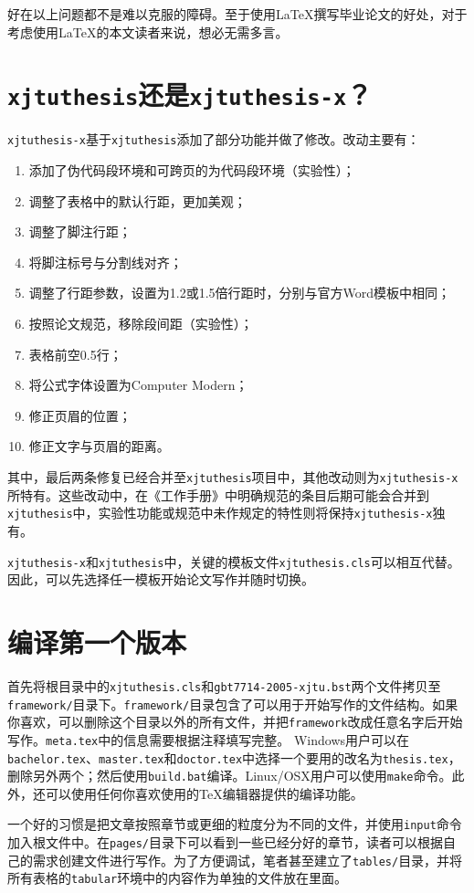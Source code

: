 好在以上问题都不是难以克服的障碍。至于使用\LaTeX 撰写毕业论文的好处，对于考虑使用\LaTeX 的本文读者来说，想必无需多言。

\section{\texttt{xjtuthesis}还是\texttt{xjtuthesis-x}？}

\texttt{xjtuthesis-x}基于\texttt{xjtuthesis}添加了部分功能并做了修改。改动主要有：
\begin{enumerate}
  \item 添加了伪代码段环境和可跨页的为代码段环境（实验性）；
  \item 调整了表格中的默认行距，更加美观；
  \item 调整了脚注行距；
  \item 将脚注标号与分割线对齐；
  \item 调整了行距参数，设置为1.2或1.5倍行距时，分别与官方Word模板中相同；
  \item 按照论文规范，移除段间距（实验性）；
  \item 表格前空0.5行；
  \item 将公式字体设置为Computer Modern；
  \item 修正页眉的位置；
  \item 修正文字与页眉的距离。
\end{enumerate}
其中，最后两条修复已经合并至\texttt{xjtuthesis}项目中，其他改动则为\texttt{xjtuthesis-x}所特有。这些改动中，在《工作手册》中明确规范的条目后期可能会合并到\texttt{xjtuthesis}中，实验性功能或规范中未作规定的特性则将保持\texttt{xjtuthesis-x}独有。

\texttt{xjtuthesis-x}和\texttt{xjtuthesis}中，关键的模板文件\texttt{xjtuthesis.cls}可以相互代替。因此，可以先选择任一模板开始论文写作并随时切换。

\section{编译第一个版本}

首先将根目录中的\texttt{xjtuthesis.cls}和\texttt{gbt7714-2005-xjtu.bst}两个文件拷贝至\texttt{framework/}目录下。\texttt{framework/}目录包含了可以用于开始写作的文件结构。如果你喜欢，可以删除这个目录以外的所有文件，并把\texttt{framework}改成任意名字后开始写作。\texttt{meta.tex}中的信息需要根据注释填写完整。
Windows用户可以在\texttt{bachelor.tex}、\texttt{master.tex}和\texttt{doctor.tex}中选择一个要用的改名为\texttt{thesis.tex}，删除另外两个；然后使用\texttt{build.bat}编译。Linux/OSX用户可以使用\texttt{make}命令。此外，还可以使用任何你喜欢使用的TeX编辑器提供的编译功能。

一个好的习惯是把文章按照章节或更细的粒度分为不同的文件，并使用\texttt{input}命令加入根文件中。在\texttt{pages/}目录下可以看到一些已经分好的章节，读者可以根据自己的需求创建文件进行写作。为了方便调试，笔者甚至建立了\texttt{tables/}目录，并将所有表格的\texttt{tabular}环境中的内容作为单独的文件放在里面。
